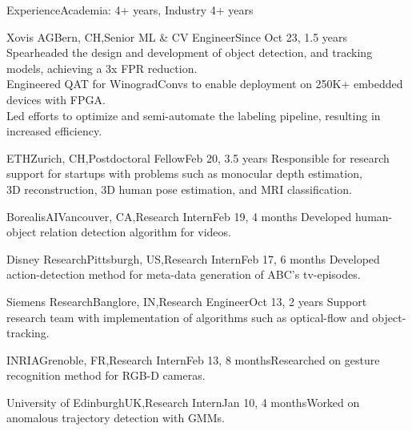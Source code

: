 \documentclass{resume_long} %
\begin{document}
 
\begin{rSection}{Experience}{\quad Academia: 4+ years, Industry 4+ years}

  \begin{rSubsections}{Xovis AG}{Bern, CH,}{Senior ML \& CV Engineer}{Since Oct 23, 1.5 years}{
    Spearheaded the design and development of object detection, and tracking models, achieving a 3x FPR reduction. \\
    Engineered QAT for WinogradConvs to enable deployment on 250K+ embedded devices with FPGA. \\
    Led efforts to optimize and semi-automate the labeling pipeline, resulting in increased efficiency.}\end{rSubsections}
  \begin{rSubsections}{ETH}{Zurich, CH,}{Postdoctoral Fellow}{Feb 20, 3.5 years }{
    Responsible for research support for startups with problems such as monocular depth estimation,\\ 3D reconstruction, 3D human pose estimation, and MRI classification.}\end{rSubsections}
  \begin{rSubsections}{BorealisAI}{Vancouver, CA,}{Research Intern}{Feb 19, 4 months}{
    Developed human-object relation detection algorithm for videos.}\end{rSubsections}
  \begin{rSubsections}{Disney Research}{Pittsburgh, US,}{Research Intern}{Feb 17, 6 months}{
    Developed action-detection method for meta-data generation of ABC's tv-episodes.}\end{rSubsections}
  \begin{rSubsections}{Siemens Research}{Banglore, IN,}{Research Engineer}{Oct 13, 2 years}{
    Support research team with implementation of algorithms such as optical-flow and object-tracking.}\end{rSubsections}
  \begin{rSubsections}{INRIA}{Grenoble, FR,}{Research Intern}{Feb 13, 8 months}{Researched on gesture recognition method for RGB-D cameras.}\end{rSubsections}
  \begin{rSubsections}{University of Edinburgh}{UK,}{Research Intern}{Jan 10, 4 months}{Worked on anomalous trajectory detection with GMMs.}\end{rSubsections}
\end{rSection}
\end{document}
